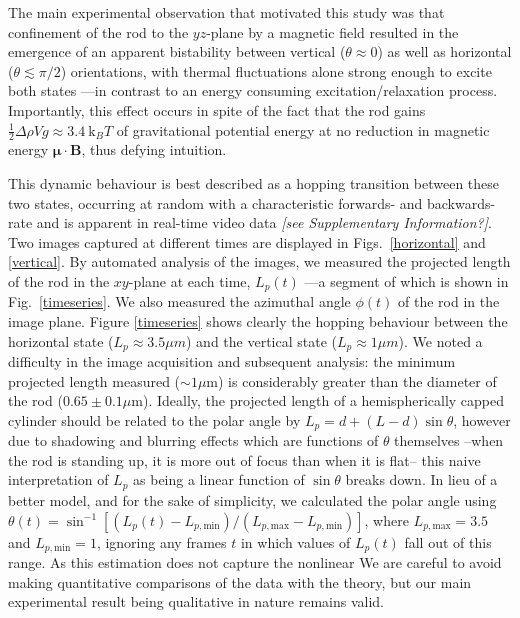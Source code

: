 \documentclass[aps,prl,twocolumn,superscriptaddress]{revtex4-1}
\newcommand{\vcrm}[1]{\mathbf{#1}}
\newcommand{\vc}[1]{\boldsymbol{#1}}
\newcommand{\kk}{\mathrm{k}_B}
\begin{document}
The main experimental observation that motivated this study was that confinement of the rod to the $yz$-plane by a magnetic field resulted in the emergence of an apparent bistability between vertical ($\theta \approx 0$) as well as horizontal ($\theta \lesssim \pi/2$) orientations, with thermal fluctuations alone strong enough to excite both states ---in contrast to an energy consuming excitation/relaxation process. Importantly, this effect occurs in spite of the fact that the rod gains $\frac{1}{2}\Delta\rho V g \approx 3.4 \ \kk T$ of gravitational potential energy at no reduction in magnetic energy $\vc{\mu}\cdot \vcrm{B}$, thus defying intuition.


This dynamic behaviour is best described as a hopping transition between these two states, occurring at random with a characteristic forwards- and backwards-rate and is apparent in real-time video data \emph{[see Supplementary Information?]}. Two images captured at different times are displayed in Figs.\ \ref{horizontal} and \ref{vertical}. By automated analysis of the images, we measured the projected length of the rod in the $xy$-plane at each time, $L_p(t)$ ---a segment of which is shown in Fig.\ \ref{timeseries}. We also measured the azimuthal angle $\phi(t)$ of the rod in the image plane. Figure \ref{timeseries} shows clearly the hopping behaviour between the horizontal state ($L_p \approx 3.5 \mu m$) and the vertical state ($L_p \approx 1 \mu m$). We noted a difficulty in the image acquisition and subsequent analysis: the minimum projected length measured ($\sim 1\mu$m) is considerably greater than the diameter of the rod ($0.65\pm0.1\mu$m). Ideally, the projected length of a hemispherically capped cylinder should be related to the polar angle by $L_p = d + (L-d)\sin\theta$, however due to shadowing and blurring effects which are functions of $\theta$ themselves --when the rod is standing up, it is more out of focus than when it is flat-- this naive interpretation of $L_p$ as being a linear function of $\sin\theta$ breaks down. In lieu of a better model, and for the sake of simplicity, we calculated the polar angle using $\theta(t) = \sin^{-1}{[(L_p(t)- L_{p,\text{min}})/(L_{p,\text{max}}-L_{p,\text{min}})]}$, where $L_{p,\text{max}}=3.5$ and $L_{p,\text{min}}=1$, ignoring any frames $t$ in which values of $L_p(t)$ fall out of this range. As this estimation does not capture the nonlinear We are careful to avoid making quantitative comparisons of the data with the theory, but our main experimental result being qualitative in nature remains valid.
\end{document}
